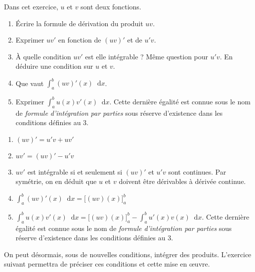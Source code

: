 \documentclass[11pt,a4paper,french]{article}
\newcommand{\diff}{\mathop{}\mathopen{}\mathrm{d}}
\theoremstyle{break}
\theoremstyle{plain}
\theoremstyle{nonumberplain}
\theoremstyle{nonumberbreak}
\begin{document}
\begin{question} Dans cet exercice, $u$ et $v$ sont deux fonctions.
  \begin{enumerate}
    \item Écrire la formule de dérivation du produit $uv$.
    \item Exprimer $uv'$ en fonction de $(uv)'$ et de $u'v$.
    \item À quelle condition $uv'$ est elle intégrable ? Même question
      pour $u'v$. En déduire une condition sur $u$ et $v$.
    \item Que vaut $\int_a^b (uv)'(x) \diff x$.
    \item Exprimer $\int_a^b u(x)v'(x) \diff x$. Cette dernière égalité
      est connue sous le nom de \emph{formule d'intégration par parties}
      sous réserve d'existence dans les conditions définies au 3.
  \end{enumerate}
\end{question}
\begin{solution}
  \begin{enumerate}
    \item $(uv)' = u'v + uv'$
    \item $uv' = (uv)' - u'v$
    \item $uv'$ est intégrable si et seulement si $(uv)'$ et $u'v$ sont
      continues. Par symétrie, on en déduit que $u$ et $v$ doivent être
      dérivables à dérivée continue.
    \item $\int_a^b (uv)'(x) \diff x = \big[ (uv)(x) \big]_a^b$
    \item $\int_a^b u(x)v'(x) \diff x = \big[ (uv)(x) \big]_a^b -
      \int_a^b u'(x)v(x) \diff x$. Cette dernière égalité
      est connue sous le nom de \emph{formule d'intégration par parties}
      sous réserve d'existence dans les conditions définies au 3.
  \end{enumerate}
\end{solution}

On peut désormais, sous de nouvelles conditions, intégrer des produits.
L'exercice suivant permettra de préciser ces conditions et cette mise en
œuvre.
\end{document}
